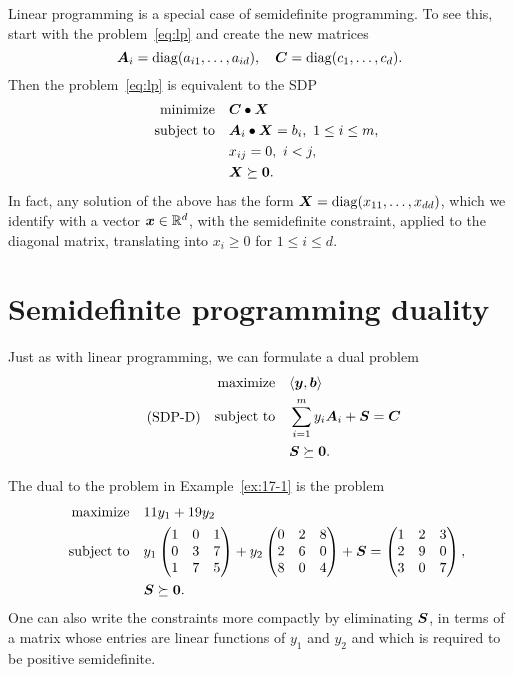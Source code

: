 Linear programming is a special case of semidefinite programming. To see this, start with the problem~\eqref{eq:lp} and create the new matrices
\begin{equation*}
 \bm{A}_i = \mathrm{diag}(a_{i1},\dots,a_{id}), \quad \bm{C} = \mathrm{diag}(c_1,\dots,c_d).
\end{equation*}
Then the problem~\eqref{eq:lp} is equivalent to the SDP
\begin{align*}
 \text{minimize}\quad & \bm{C}\bullet \bm{X}\\
 \quad\text{subject to}\quad & \bm{A}_i\bullet \bm{X} = b_i, \ 1\leq i\leq m,\\
 & x_{ij}=0, \ i<j,\\
 & \bm{X}\succeq \bm{0}.
\end{align*}
In fact, any solution of the above has the form $\bm{X}=\mathrm{diag}(x_{11},\dots,x_{dd})$, which we identify with a vector $\bm{x}\in \mathbb{R}^d$, with the semidefinite constraint, applied to the diagonal matrix, translating into $x_i\geq 0$ for $1\leq i\leq d$.

\section{Semidefinite programming duality}
Just as with linear programming, we can formulate a dual problem
\begin{align}\label{eq:sdp-d}\tag{SDP-D}
 \begin{split}
  \text{maximize}\quad & \langle {\bm{y}}, {\bm{b}} \rangle\\
  \quad\text{subject to}\quad & \sum_{i=1}^m y_i \bm{A}_i + \bm{S}=\bm{C}\\
  & \bm{S}\succeq \bm{0}.
 \end{split}
\end{align}

\begin{example}
 The dual to the problem in Example~\ref{ex:17-1} is the problem
 \begin{align*}
  \text{maximize}\quad & 11y_1+19y_2\\
  \quad\text{subject to}\quad & y_1\begin{pmatrix}
                1 & 0 & 1\\
                0 & 3 & 7\\
                1 & 7 & 5
               \end{pmatrix}
	+ y_2 \begin{pmatrix}
	       0 & 2 & 8\\
	       2 & 6 & 0\\
	       8 & 0 & 4
	      \end{pmatrix}
 + \bm{S} = 
\begin{pmatrix}
 1 & 2 & 3\\
 2 & 9 & 0\\
 3 & 0 & 7
\end{pmatrix},\\
& \bm{S}\succeq \bm{0}.
 \end{align*}
 One can also write the constraints more compactly by eliminating $\bm{S}$, in terms of a matrix whose entries are linear functions of $y_1$ and $y_2$ and which is required to be positive semidefinite.
\end{example}

